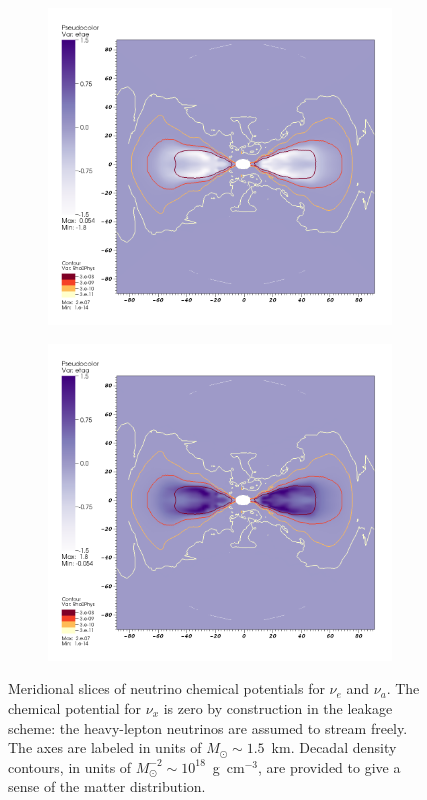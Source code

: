 \begin{figure}
  \centering
  \begin{subfigure}{.31\textwidth}
    \centering
    \includegraphics[width=1\linewidth]{Figures/etae_meridional}
  \end{subfigure}
  \begin{subfigure}{.31\textwidth}
    \centering
    \includegraphics[width=1\linewidth]{Figures/etaa_meridional}
  \end{subfigure}
  \caption[Disk neutrino chemical potentials]{
    Meridional slices of neutrino chemical potentials for $\nu_e$ and
    $\nu_a$. The chemical potential for $\nu_x$ is zero by construction
    in the leakage scheme: the heavy-lepton neutrinos are assumed to
    stream freely.
    The axes are labeled in units of $M_\odot\sim1.5$~km.
    Decadal density contours, in units of $M_\odot^{-2}\sim10^{18}$~g~cm$^{-3}$,
    are provided to give a sense of the matter distribution.
  }
  \label{fig:eta_meridional}
\end{figure}

